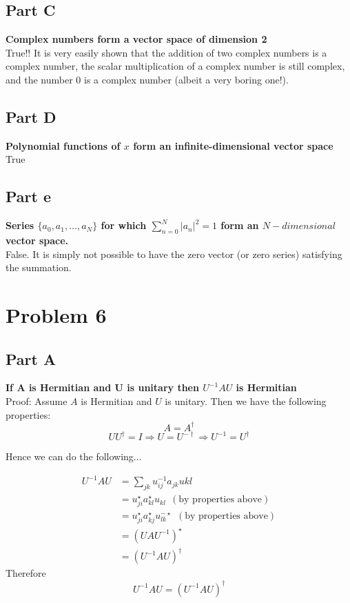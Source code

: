 \documentclass[10pt,a4paper]{article}
\begin{document}
	\subsection{Part C}
	\textbf{Complex numbers form a vector space of dimension 2}\\
	True!! It is very easily shown that the addition of two complex numbers is a complex number, the scalar multiplication of a complex number is still complex, and the number $0$ is a complex number (albeit a very boring one!).
	
	\subsection{Part D}
	\textbf{Polynomial functions of $x$ form an infinite-dimensional vector space}\\
	True
	
	\subsection{Part e}
	\textbf{Series $\{a_0,a_1,\dots ,a_N\}$ for which $\sum_{n=0}^N|a_n|^2 = 1$ form an $N-dimensional$ vector space.}\\
	False. It is simply not possible to have the zero vector (or zero series) satisfying the summation.




	\section{Problem 6}
	\subsection{Part A}
	\textbf{If A is Hermitian and U is unitary then $U^{-1}AU$ is Hermitian} \\
	Proof: Assume $A$ is Hermitian and $U$ is unitary. Then we have the following properties:
	$$A = A^\dagger $$
	$$UU^\dagger = I \Rightarrow U=U^{-\dagger} \Rightarrow U^{-1} = U^\dagger $$
	
	Hence we can do the following...
	
	\begin{equation}
		\begin{split}
			U^{-1}AU & = \sum_{jk} u^{-1}_{ij}a_{jk}u{kl}\\
			& = u_{ji}^\star a_{kl}^\star u_{kl} \ \ (\text{by properties above})\\
			& = u_{ji}^\star a_{kj}^\star u_{lk}^{-\star} \ \ (\text{by properties above})\\
			& = (UAU^{-1})^\star \\
			& = (U^{-1}AU)^\dagger
		\end{split} 
	\end{equation}
	Therefore $$U^{-1}AU = (U^{-1}AU)^\dagger $$
	
\end{document}
